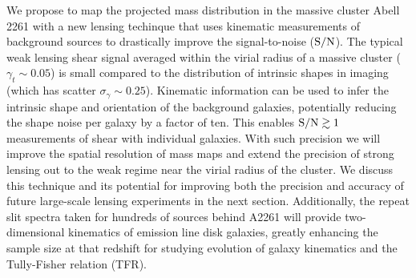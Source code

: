 \documentclass[12pt]{article}
\begin{document}
We propose to map the projected mass distribution in the massive cluster Abell 2261 with a new lensing techinque that uses kinematic measurements of background sources to drastically improve the signal-to-noise (${\rm S/N}$). The typical weak lensing shear signal averaged within the virial radius of a massive cluster ($\gamma_t\sim0.05$) is small compared to the distribution of intrinsic shapes in imaging (which has scatter $\sigma_\gamma\sim0.25$). Kinematic information can be used to infer the intrinsic shape and orientation of the background galaxies, potentially reducing the shape noise per galaxy by a factor of ten. This enables ${\rm S/N}\gtrsim1$ measurements of shear with individual galaxies. With such precision we will improve the spatial resolution of mass maps and extend the precision of strong lensing out to the weak regime near the virial radius of the cluster. We discuss this technique and its potential for improving both the precision and accuracy of future large-scale lensing experiments in the next section. Additionally, the repeat slit spectra taken for hundreds of sources behind A2261 will provide two-dimensional kinematics of emission line disk galaxies, greatly enhancing the sample size at that redshift for studying evolution of galaxy kinematics and the Tully-Fisher relation (TFR).
\end{document}
